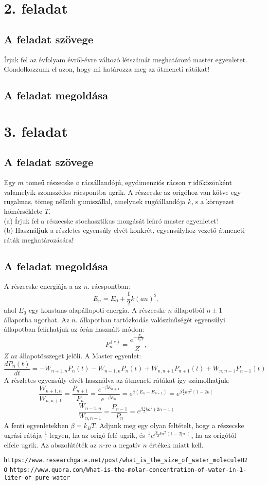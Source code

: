 \documentclass[12pt]{article}
\begin{document}
\section*{2. feladat}
\subsection*{A feladat szövege}
Írjuk fel az évfolyam évről-évre változó létszámát meghatározó master egyenletet. Gondolkozzunk el azon, hogy mi határozza meg az átmeneti rátákat!

\subsection*{A feladat megoldása}

\newpage
\section*{3. feladat}
\subsection*{A feladat szövege}
Egy $m$ tömeű részecske $a$ rácsállandójú, egydimenziós rácson $\tau$ időközönként valamelyik
szomszédos rácspontba ugrik. A részecske az origóhoz van kötve egy rugalmas, tömeg nélküli gumiszállal, amelynek rugóállandója $k$, s a környezet hőmérséklete $T$.\\
(a) Írjuk fel a részecske stochasztikus mozgását leíıró master egyenletet!\\
(b) Használjuk a részletes egyensúly elvét konkrét, egyensúlyhoz vezető átmeneti ráták meghatározására!

\subsection*{A feladat megoldása}
A részecske energiája a az $n.$ rácspontban:
$$E_n = E_0+\frac{1}{2}k(an)^2,$$
ahol $E_0$ egy konstans alapállapoti energia. A részecske $n$ állapotból $n\pm 1$ állapotba ugorhat. Az $n.$ állapotban tartózkodás valószínűségét egyensúlyi állapotban felírhatjuk az órán használt módon:
$$P^{(e)}_n = \frac{e^{-\frac{E_n}{k_B T}}}{Z},$$
$Z$ az állapotösszeget jelöli.  A Master egyenlet:
$$\frac{dP_n(t)}{dt }= -W_{n+1,n}P_n(t)-W_{n-1,n}P_{n}(t) + W_{n, n+1}P_{n+1}(t)+W_{n, n-1}P_{n-1}(t)$$
A részletes egyensúly elvét  használva az átmeneti rátákat így számolhatjuk:
$$\frac{W_{n+1, n}}{W_{n, n+1}} = \frac{P_{n+1}}{P_n} = \frac{e^{-\beta E_{n+1}}}{e^{-\beta E_n}} = e^{\beta (E_n-E_{n+1})} = e^{\beta\frac{1}{2}ka^2(1-2n)}$$
$$\frac{W_{n-1,n}}{W_{n, n-1}} = \frac{P_{n-1}}{P_n} = e^{\beta \frac{1}{2}ka^2(2n-1)}$$
A fenti egyenletekben $\beta = k_B T$. Adjunk meg egy olyan feltételt, hogy a részecske ugrási rátája $\frac{1}{\tau}$ legyen, ha az origó felé ugrik, és $\frac{1}{\tau}e^{\beta\frac{1}{2}ka^2(1-2|n|)}$, ha az origótól elfele ugrik. Az abszolútéték az $n$-re a negatív $n$ értékek miatt kell.
 





\begin{thebibliography}{9}

\texttt{https://www.researchgate.net/post/what\_{}is\_{}the\_{}size\_{}of\_{}water\_{}moleculeH2O}
\texttt{https://www.quora.com/What-is-the-molar-concentration-of-water-in-1-liter-of-pure-water}


\end{thebibliography}
\end{document}
